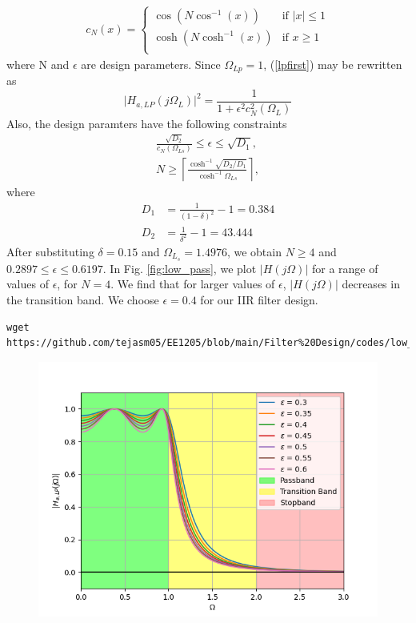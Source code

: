 \documentclass{article}
\begin{document}
\begin{enumerate}
\begin{align*}
    c_N(x) = \begin{cases}
        \cos(N\cos^{-1}(x)) & \text{if } \lvert x \rvert \leq 1\\
        \operatorname{cosh}(N\cosh^{-1}(x)) & \text{if } x \geq 1\\
    \end{cases}
\end{align*}
where N and $\epsilon$ are design parameters.  Since $\Omega_{Lp} = 1$, (\ref{lpfirst}) may be rewritten as
\begin{equation}
\label{lpsecond}
\vert H_{a,LP}(j\Omega_L)\vert^2 = \frac{1}{1 + \epsilon^2c_N^2(\Omega_L)}
\end{equation}
Also, the design paramters have the following constraints
\begin{eqnarray}
\label{lpdesign}
\frac{\sqrt{D_2}}{c_N(\Omega_{Ls})} \leq \epsilon \leq \sqrt{D_1}, \nonumber \\
N \geq \left\lceil \frac{\cosh^{-1}\sqrt{D_2/D_1}}{\cosh^{-1}\Omega_{Ls}} \right\rceil,
\end{eqnarray}
where 
\begin{align*}
    D_1 &= \frac{1}{(1 - \delta)^2}-1 = 0.384\\
    D_2 &= \frac{1}{\delta^2} - 1 = 43.444
\end{align*}
After substituting $\delta = 0.15$ and $\Omega_{L_s} = 1.4976$, 
we obtain $N \geq 4$ and $0.2897 \leq \epsilon \leq 0.6197$.  In Fig. \ref{fig:low_pass}, we plot $\vert H(j\Omega)\vert$ for a range of values of $\epsilon$, for $N = 4$.  We find that for larger values of $\epsilon$, $|H(j\Omega)|$ decreases in the transition band.  We choose $\epsilon = 0.4$  for our IIR filter design.
\begin{lstlisting}[caption = {Code for Figure 1}]
wget https://github.com/tejasm05/EE1205/blob/main/Filter%20Design/codes/low_pass.py
\end{lstlisting}
\begin{figure}[!h]
    \centering
    \includegraphics[width = \columnwidth]{figs/low_pass.png}

\end{figure}
\end{enumerate}
\end{document}
